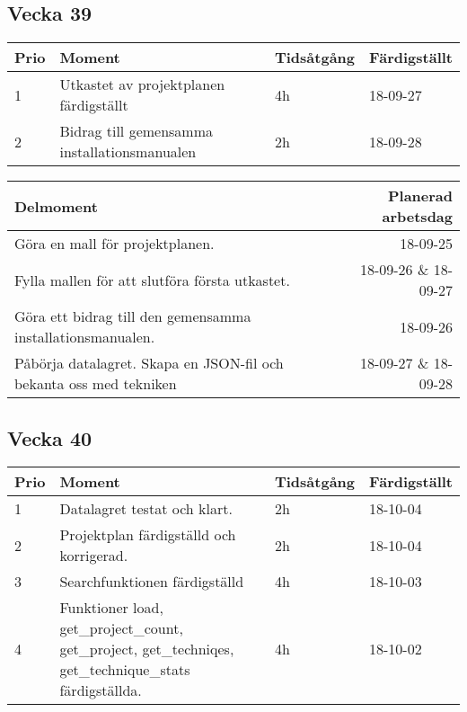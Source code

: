 \documentclass{TDP003mall}
\begin{document}
\subsection{Vecka 39}
\begin{table}[!h]
\begin{tabularx}{\linewidth}{|l|X|l|l|}
\hline
\textbf{Prio} & \textbf{Moment} & \textbf{Tidsåtgång} & \textbf{Färdigställt}\\\hline
1& Utkastet av projektplanen färdigställt & 4h	& 18-09-27 \\\hline
2& Bidrag till gemensamma installationsmanualen & 2h &  18-09-28 \\\hline
\end{tabularx}
\end{table}

\begin{table}[!h]
\begin{tabularx}{\linewidth}{|X|r|}\hline
    \textbf{Delmoment} & \textbf{ Planerad arbetsdag} \\\hline
    Göra en mall för projektplanen. & 18-09-25 \\\hline
    Fylla mallen för att slutföra första utkastet. & 18-09-26 \& 18-09-27 \\\hline
    Göra ett bidrag till den gemensamma installationsmanualen. & 18-09-26 \\\hline
    Påbörja datalagret. Skapa en JSON-fil och bekanta oss med tekniken & 18-09-27 \& 18-09-28 \\\hline
\end{tabularx}
\end{table}
\newpage
\subsection{Vecka 40}
\begin{table}[!h]
\begin{tabularx}{\linewidth}{|l|X|l|l|}\hline
\textbf{Prio} & \textbf{Moment} & \textbf{Tidsåtgång} & \textbf{Färdigställt}\\\hline
1& Datalagret testat och klart. & 2h & 18-10-04 \\\hline
2& Projektplan färdigställd och korrigerad. & 2h & 18-10-04 \\\hline
3& Searchfunktionen färdigställd & 4h & 18-10-03 \\\hline
4& Funktioner load, get\_project\_count, get\_project, get\_techniqes, get\_technique\_stats färdigställda. & 4h & 18-10-02 \\\hline
\end{tabularx}
\end{table}
\end{document}
